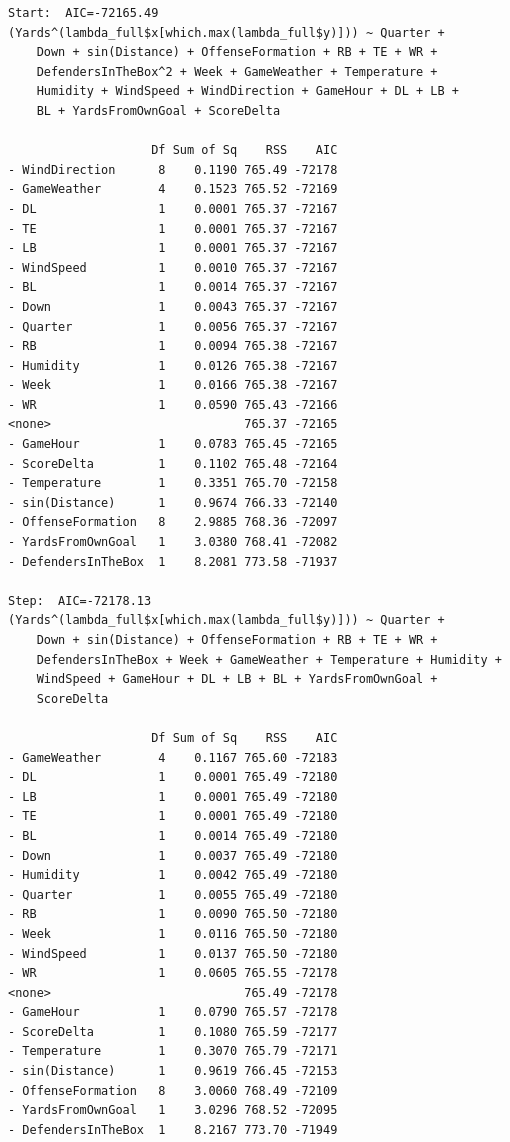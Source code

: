 \documentclass[
  super,
  preprint,
  3p]{elsarticle}
\begin{document}
\begin{verbatim}
Start:  AIC=-72165.49
(Yards^(lambda_full$x[which.max(lambda_full$y)])) ~ Quarter + 
    Down + sin(Distance) + OffenseFormation + RB + TE + WR + 
    DefendersInTheBox^2 + Week + GameWeather + Temperature + 
    Humidity + WindSpeed + WindDirection + GameHour + DL + LB + 
    BL + YardsFromOwnGoal + ScoreDelta

                    Df Sum of Sq    RSS    AIC
- WindDirection      8    0.1190 765.49 -72178
- GameWeather        4    0.1523 765.52 -72169
- DL                 1    0.0001 765.37 -72167
- TE                 1    0.0001 765.37 -72167
- LB                 1    0.0001 765.37 -72167
- WindSpeed          1    0.0010 765.37 -72167
- BL                 1    0.0014 765.37 -72167
- Down               1    0.0043 765.37 -72167
- Quarter            1    0.0056 765.37 -72167
- RB                 1    0.0094 765.38 -72167
- Humidity           1    0.0126 765.38 -72167
- Week               1    0.0166 765.38 -72167
- WR                 1    0.0590 765.43 -72166
<none>                           765.37 -72165
- GameHour           1    0.0783 765.45 -72165
- ScoreDelta         1    0.1102 765.48 -72164
- Temperature        1    0.3351 765.70 -72158
- sin(Distance)      1    0.9674 766.33 -72140
- OffenseFormation   8    2.9885 768.36 -72097
- YardsFromOwnGoal   1    3.0380 768.41 -72082
- DefendersInTheBox  1    8.2081 773.58 -71937

Step:  AIC=-72178.13
(Yards^(lambda_full$x[which.max(lambda_full$y)])) ~ Quarter + 
    Down + sin(Distance) + OffenseFormation + RB + TE + WR + 
    DefendersInTheBox + Week + GameWeather + Temperature + Humidity + 
    WindSpeed + GameHour + DL + LB + BL + YardsFromOwnGoal + 
    ScoreDelta

                    Df Sum of Sq    RSS    AIC
- GameWeather        4    0.1167 765.60 -72183
- DL                 1    0.0001 765.49 -72180
- LB                 1    0.0001 765.49 -72180
- TE                 1    0.0001 765.49 -72180
- BL                 1    0.0014 765.49 -72180
- Down               1    0.0037 765.49 -72180
- Humidity           1    0.0042 765.49 -72180
- Quarter            1    0.0055 765.49 -72180
- RB                 1    0.0090 765.50 -72180
- Week               1    0.0116 765.50 -72180
- WindSpeed          1    0.0137 765.50 -72180
- WR                 1    0.0605 765.55 -72178
<none>                           765.49 -72178
- GameHour           1    0.0790 765.57 -72178
- ScoreDelta         1    0.1080 765.59 -72177
- Temperature        1    0.3070 765.79 -72171
- sin(Distance)      1    0.9619 766.45 -72153
- OffenseFormation   8    3.0060 768.49 -72109
- YardsFromOwnGoal   1    3.0296 768.52 -72095
- DefendersInTheBox  1    8.2167 773.70 -71949


\end{verbatim}
\end{document}
